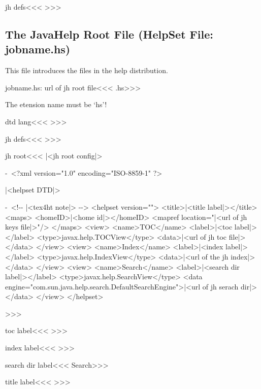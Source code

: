 \<jh defs\><<<
>>>


\subsection{The JavaHelp Root File (HelpSet File: jobname.hs)}

This file introduces the files in the help distribution.


\<jobname.hs: url of jh root file\><<<
\jobname.hs>>>


The etension name must be `hs'!



\<dtd lang\><<<
\dTdLaNg>>>

\<jh defs\><<<
\def\dTdLaNg{\expandafter
  \ifx \csname a:dtd-lang\endcsname\relax EN\else
    \csname a:dtd-lang\endcsname
  \fi   }
>>>

\<jh root\><<<
|<jh root config|>
\IgnorePar\par\leavevmode{}%
\begin{dito}-\
<?xml version="1.0" encoding="ISO-8859-1" ?>
\end{dito}
|<helpset DTD|>
\begin{dito}-\
<!-\relax- |<tex4ht note|> -\relax->
<helpset version="\dotVersion">
  <title>|<title label|></title>
  <maps>
    <homeID>|<home id|></homeID>
    <mapref location="|<url of jh keys file|>"/>
  </maps>
  <view>
    <name>TOC</name>
    <label>|<toc label|></label>
    <type>javax.help.TOCView</type>
    <data>|<url of jh toc file|></data>
  </view>
  <view>
    <name>Index</name>
    <label>|<index label|></label>
    <type>javax.help.IndexView</type>
    <data>|<url of the jh index|></data>
  </view>
  <view>
    <name>Search</name>
    <label>|<search dir label|></label>
    <type>javax.help.SearchView</type>
    <data 
      engine="com.sun.java.help.search.DefaultSearchEngine">|<url of jh serach dir|></data>
  </view>
</helpset>
\end{dito}
\IgnorePar\par\leavevmode{}
>>>



\<toc label\><<<
\tocLabel>>>

\<index label\><<<
\indexLabel>>>

\<search dir label\><<<
Search>>>

\<title label\><<<
\titleLabel>>>


